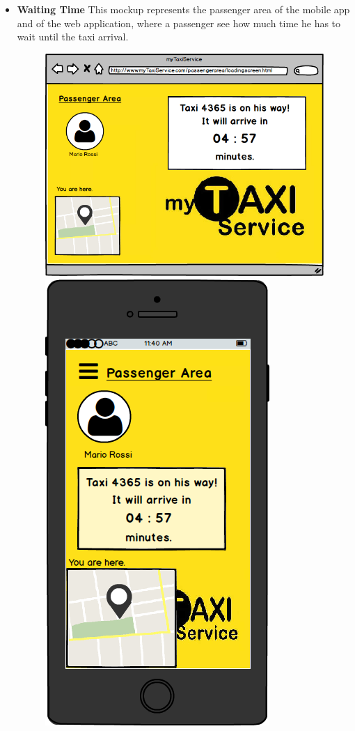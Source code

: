 \documentclass[18pt,oneside,a4paper, titlepage]{article}
\begin{document}
\begin{itemize}
\begin{figure}[h]
				\end{figure}
				\\ \\ 
				\item \textbf{Waiting Time} This mockup represents the passenger area of the mobile app and of the web application, where a passenger see how much time he has to wait until the taxi arrival.\\
				\begin{figure}[h]
					\includegraphics[scale=0.3]{Mockups/WebAppTaxiIsArriving.png}%
					\qquad\qquad
					\includegraphics[scale=0.3]{Mockups/MobileAppTaxiIsArriving.png}

\end{figure}
\end{itemize}
\end{document}
